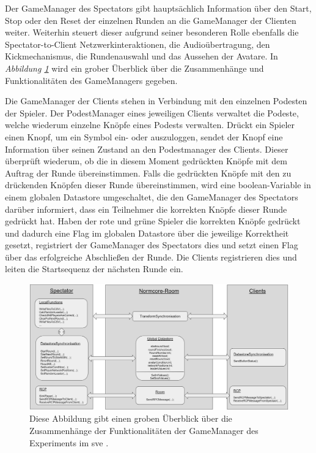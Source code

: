 \documentclass[a4paper,11pt]{article}%
\renewcommand{\\}{\vspace*{0.5\baselineskip} \newline}
\begin{document}
Der GameManager des Spectators gibt hauptsächlich Information über den Start, Stop oder den Reset der einzelnen Runden an die GameManager der Clienten weiter. Weiterhin steuert dieser aufgrund seiner besonderen Rolle ebenfalls die Spectator-to-Client Netzwerkinteraktionen, die Audioübertragung, den Kickmechanismus, die Rundenauswahl und das Aussehen der Avatare.
In \textit{Abbildung \ref{GameManagerClientSpectator}} wird ein grober Überblick über die Zusammenhänge und Funktionalitäten des GameManagers gegeben.

Die GameManager der Clients stehen in Verbindung mit den einzelnen Podesten der Spieler. Der PodestManager eines jeweiligen Clients verwaltet die Podeste, welche wiederum einzelne Knöpfe eines Podests verwalten. 
Drückt ein Spieler einen Knopf, um ein Symbol ein- oder auszuloggen, sendet der Knopf eine Information über seinen Zustand an den Podestmanager des Clients. Dieser überprüft wiederum, ob die in diesem Moment gedrückten Knöpfe mit dem Auftrag der Runde übereinstimmen. Falls die gedrückten Knöpfe mit den zu drückenden Knöpfen dieser Runde übereinstimmen, wird eine boolean-Variable in einem globalen Datastore umgeschaltet, die den GameManager des Spectators darüber informiert, dass ein Teilnehmer die korrekten Knöpfe dieser Runde gedrückt hat. Haben der rote und grüne Spieler die korrekten Knöpfe gedrückt und dadurch eine Flag im globalen Datastore über die jeweilige Korrektheit gesetzt, registriert der GameManager des Spectators dies und setzt einen Flag über das erfolgreiche Abschließen der Runde. Die Clients registrieren dies und leiten die Startsequenz der nächsten Runde ein. 

\begin{figure}[H]
		\begin{footnotesize}
		\centering
			\includegraphics[width=\textwidth]{Abbildungen/GameManagerClientSpectator.jpg}
			\caption[Funktionalitäten des GameManagers]{Diese Abbildung gibt einen groben Überblick über die Zusammenhänge der Funktionalitäten der GameManager des Experiments im \ac{sve} .}
			\label{GameManagerClientSpectator}
		\end{footnotesize}
	\end{figure}
\end{document}
